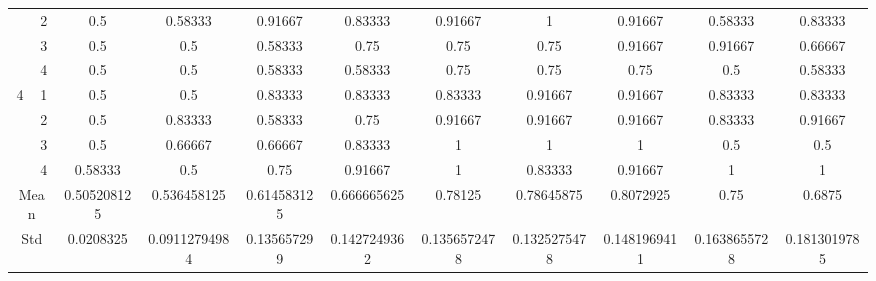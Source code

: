 \documentclass[draft,dvipsnames]{drexel-thesis}
\begin{document}
\begin{thesis}
\begin{table}[!t]
{\begin{tabular}{|c|c|c|c|c|c|c|c|c|c|c|}
                      & 2                   & 0.5         & 0.58333       & 0.91667     & 0.83333      & 0.91667      & 1            & 0.91667      & 0.58333      & 0.83333      \\ \cline{2-11} 
                      & 3                   & 0.5         & 0.5           & 0.58333     & 0.75         & 0.75         & 0.75         & 0.91667      & 0.91667      & 0.66667      \\ \cline{2-11} 
                      & 4                   & 0.5         & 0.5           & 0.58333     & 0.58333      & 0.75         & 0.75         & 0.75         & 0.5          & 0.58333      \\ \hline
\multirow{4}{*}{4}    & 1                   & 0.5         & 0.5           & 0.83333     & 0.83333      & 0.83333      & 0.91667      & 0.91667      & 0.83333      & 0.83333      \\ \cline{2-11} 
                      & 2                   & 0.5         & 0.83333       & 0.58333     & 0.75         & 0.91667      & 0.91667      & 0.91667      & 0.83333      & 0.91667      \\ \cline{2-11} 
                      & 3                   & 0.5         & 0.66667       & 0.66667     & 0.83333      & 1            & 1            & 1            & 0.5          & 0.5          \\ \cline{2-11} 
                      & 4                   & 0.58333     & 0.5           & 0.75        & 0.91667      & 1            & 0.83333      & 0.91667      & 1            & 1            \\ \hline
\multicolumn{2}{|c|}{Mean}                  & 0.505208125 & 0.536458125   & 0.614583125 & 0.666665625  & 0.78125      & 0.78645875   & 0.8072925    & 0.75         & 0.6875       \\ \hline
\multicolumn{2}{|c|}{Std}                   & 0.0208325   & 0.09112794984 & 0.135657299 & 0.1427249362 & 0.1356572478 & 0.1325275478 & 0.1481969411 & 0.1638655728 & 0.1813019785 \\ \hline
\end{tabular}}
\end{table}



\end{thesis}
\end{document}
